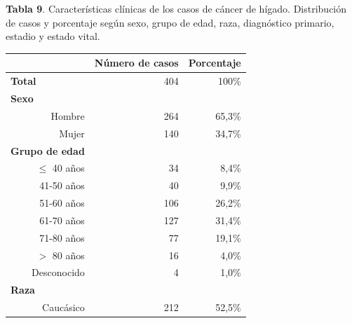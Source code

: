 \newpage
\textbf{Tabla 9}. Características clínicas de los casos de cáncer de hígado. Distribución de casos y porcentaje según sexo, grupo de edad, raza, diagnóstico primario, estadio y estado vital.
\begin{table}[H]
	\centering \small
	\begin{tabular}{rrr}
		\hline
		\multicolumn{1}{l}{}                              & \textbf{Número de casos} & \textbf{Porcentaje}       \\ \hline
		\multicolumn{1}{l}{\textbf{Total}}                & 404                      & \multicolumn{1}{r}{100\%} \\ \hline
		\multicolumn{1}{l}{\textbf{Sexo}}                 &                          & \multicolumn{1}{l}{}      \\
		Hombre                                            & 264                      & 65,3\%                    \\
		Mujer                                             & 140                      & 34,7\%                    \\ \hline
		\multicolumn{1}{l}{\textbf{Grupo de edad}}        &                          &                           \\
		$\leq$ 40 años                                         & 34                       & 8,4\%                     \\
		41-50 años                                        & 40                       & 9,9\%                     \\
		51-60 años                                        & 106                      & 26,2\%                    \\
		61-70 años                                        & 127                      & 31,4\%                    \\
		71-80 años                                        & 77                       & 19,1\%                    \\
		$>$ 80 años                                     & 16                       & 4,0\%                       \\
		Desconocido                                       & 4                        & 1,0\%                       \\ \hline
		\multicolumn{1}{l}{\textbf{Raza}}                 &                          &                           \\
		Caucásico                                            & 212                      & 52,5\%                    \\

\end{tabular}
\end{table}
